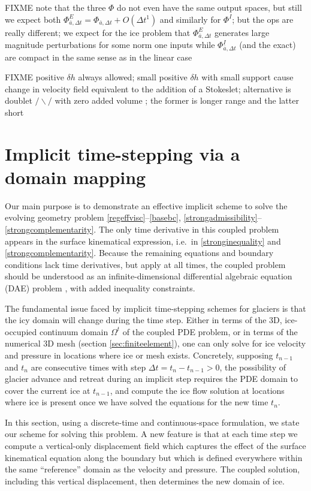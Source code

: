 \documentclass[letterpaper,final,12pt,reqno]{amsart}
\begin{document}
FIXME note that the three $\Phi$ do not even have the same output spaces, but still we expect both $\Phi^E_{\bar a,\Delta t} = \Phi_{\bar a,\Delta t} + O(\Delta t^1)$ and similarly for $\Phi^I$; but the ops are really different;  we expect for the ice problem that $\Phi^E_{\bar a,\Delta t}$ generates large magnitude perturbations for some norm one inputs while $\Phi^I_{\bar a,\Delta t}$ (and the exact) are compact in the same sense as in the linear case

FIXME positive $\delta h$ always allowed; small positive $\delta h$ with small support cause change in velocity field equivalent to the addition of a Stokeslet; alternative is doublet $/\backslash/$ with zero added volume \cite{ChwangWu1975}; the former is longer range and the latter short


\section{Implicit time-stepping via a domain mapping} \label{sec:implicitstep}

Our main purpose is to demonstrate an effective implicit scheme to solve the evolving geometry problem \eqref{regeffvisc}--\eqref{basebc}, \eqref{strongadmissibility}--\eqref{strongcomplementarity}.  The only time derivative in this coupled problem appears in the surface kinematical expression, i.e.~in \eqref{stronginequality} and \eqref{strongcomplementarity}.  Because the remaining equations and boundary conditions lack time derivatives, but apply at all times, the coupled problem should be understood as an infinite-dimensional differential algebraic equation (DAE) problem \cite{AscherPetzold1998}, with added inequality constraints.

The fundamental issue faced by implicit time-stepping schemes for glaciers is that the icy domain will change during the time step.  Either in terms of the 3D, ice-occupied continuum domain $\Omega^t$ of the coupled PDE problem, or in terms of the numerical 3D mesh (section \ref{sec:finiteelement}), one can only solve for ice velocity and pressure in locations where ice or mesh exists.  Concretely, supposing $t_{n-1}$ and $t_n$ are consecutive times with step $\Delta t = t_n - t_{n-1} > 0$, the possibility of glacier advance and retreat during an implicit step requires the PDE domain to cover the current ice at $t_{n-1}$, and compute the ice flow solution at locations where ice is present once we have solved the equations for the new time $t_n$.

In this section, using a discrete-time and continuous-space formulation, we state our scheme for solving this problem.  A new feature is that at each time step we compute a vertical-only displacement field which captures the effect of the surface kinematical equation along the boundary but which is defined everywhere within the same ``reference'' domain as the velocity and pressure.  The coupled solution, including this vertical displacement, then determines the new domain of ice.
\end{document}
